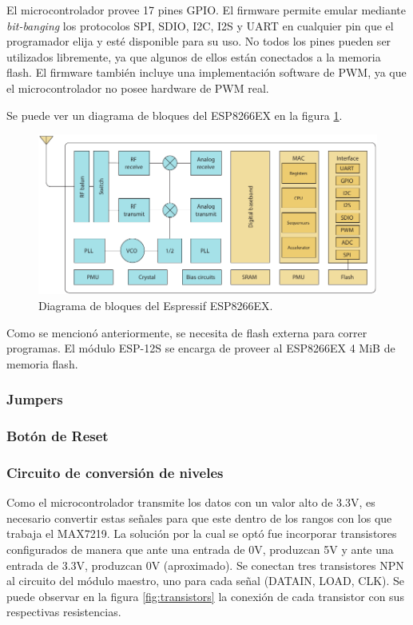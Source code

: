 El microcontrolador provee 17 pines GPIO. El firmware permite emular mediante \emph{bit-banging} los protocolos SPI, SDIO, I2C, I2S y UART en cualquier pin que el programador elija y esté disponible para su uso. No todos los pines pueden ser utilizados libremente, ya que algunos de ellos están conectados a la memoria flash. El firmware también incluye una implementación software de PWM, ya que el microcontrolador no posee hardware de PWM real.

Se puede ver un diagrama de bloques del ESP8266EX en la figura \ref{fig:diagrama-bloques-esp8266ex}.

\begin{figure}[htp!]
	\centering
	\begin{center}
	\includegraphics[width=\linewidth]{imagenes/diagrama-bloques-esp8266.pdf}
	\caption{Diagrama de bloques del Espressif ESP8266EX.}
	\label{fig:diagrama-bloques-esp8266ex}
	\end{center}
\end{figure}

Como se mencionó anteriormente, se necesita de flash externa para correr programas. El módulo ESP-12S se encarga de proveer al ESP8266EX 4 MiB de memoria flash.

\subsubsection{Jumpers}

\subsubsection{Botón de Reset}

\subsubsection{Circuito de conversión de niveles} \label{sec:transistores}
Como el microcontrolador transmite los datos con un valor alto de 3.3V, es necesario convertir estas señales para que este dentro de los rangos con los que trabaja el MAX7219. La solución por la cual se optó fue incorporar transistores configurados de manera que ante una entrada de 0V, produzcan 5V y ante una entrada de 3.3V, produzcan 0V (aproximado). Se conectan tres transistores NPN al circuito del módulo maestro, uno para cada señal (DATAIN, LOAD, CLK). Se puede observar en la figura \ref{fig:transistors} la conexión de cada transistor con sus respectivas resistencias. 

